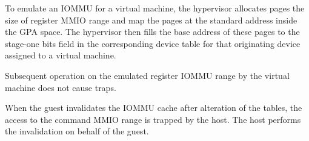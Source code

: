 To emulate an IOMMU for a virtual machine, the hypervisor allocates pages the size of
register MMIO range and map the pages at the standard address inside the GPA space. The
hypervisor then fills the base address of these pages to the stage-one bits field in the
corresponding device table for that originating device assigned to a virtual machine.

Subsequent operation on the emulated register IOMMU range by the virtual machine does not
cause traps.

When the guest invalidates the IOMMU cache after alteration of the tables, the access to
the command MMIO range is trapped by the host. The host performs the invalidation on
behalf of the guest.

